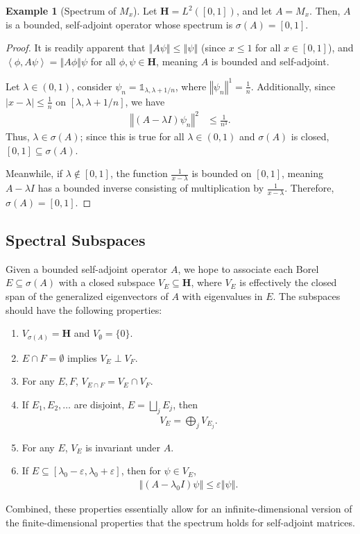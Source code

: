 \documentclass[12pt]{extarticle}
\newcommand{\iprod}[2]{\left\langle #1,#2\right\rangle}
\newcommand{\norm}[1]{\left\Vert #1\right\Vert}
\theoremstyle{plain}
\theoremstyle{definition}
\newtheorem*{example}{Example}
\theoremstyle{remark}
\renewcommand{\newline}{\hfill\break}
\begin{document}
  \begin{example}[Spectrum of $M_x$]
    Let $\mathbf{H} = L^{2}\left([0,1]\right)$, and let $A = M_x$. Then, $A$ is a bounded, self-adjoint operator whose spectrum is $\sigma(A) = [0,1]$.
  \end{example}
  \begin{proof}
    It is readily apparent that $\norm{A\psi} \leq \norm{\psi}$ (since $x\leq 1$ for all $x\in [0,1]$), and $\iprod{\phi}{A\psi} = \norm{A\phi}{\psi}$ for all $\phi,\psi \in \mathbf{H}$, meaning $A$ is bounded and self-adjoint.\newline

    Let $\lambda \in (0,1)$, consider $\psi_n = \mathbb{1}_{\lambda,\lambda + 1/n}$, where $\norm{\psi_n}^1 = \frac{1}{n}$. Additionally, since $|x - \lambda| \leq \frac{1}{n}$ on $[\lambda,\lambda + 1/n]$, we have
    \begin{align*}
      \norm{(A - \lambda I)\psi_n}^2 &\leq \frac{1}{n^3}.
    \end{align*}
    Thus, $\lambda \in \sigma(A)$; since this is true for all $\lambda \in (0,1)$ and $\sigma(A)$ is closed, $[0,1]\subseteq \sigma(A)$.\newline

    Meanwhile, if $\lambda \notin [0,1]$, the function $\frac{1}{x - \lambda}$ is bounded on $[0,1]$, meaning $A - \lambda I$ has a bounded inverse consisting of multiplication by $\frac{1}{x - \lambda}$. Therefore,$\sigma(A) = [0,1]$.
  \end{proof}
  \subsection{Spectral Subspaces}%
  Given a bounded self-adjoint operator $A$, we hope to associate each Borel $E\subseteq \sigma(A)$ with a closed subspace $V_E\subseteq \mathbf{H}$, where $V_E$  is effectively the closed span of the generalized eigenvectors of $A$ with eigenvalues in $E$. The subspaces should have the following properties:
  \begin{enumerate}[(1)]
    \item $V_{\sigma(A)} = \mathbf{H}$ and $V_{\emptyset} = \{0\}$.
    \item $E\cap F = \emptyset$ implies $V_E \perp V_F$.
    \item For any $E,F$, $V_{E\cap F} = V_E \cap V_F$.
    \item If $E_1,E_2,\dots$ are disjoint, $E = \bigsqcup_{j}E_j$, then
      \begin{align*}
        V_E = \bigoplus_{j} V_{E_j}.
      \end{align*}
    \item For any $E$, $V_E$ is invariant under $A$.
    \item If $E\subseteq [\lambda_0 - \varepsilon, \lambda_0 + \varepsilon]$, then for $\psi \in V_E$,
      \begin{align*}
        \norm{\left(A - \lambda_0 I\right)\psi} \leq \varepsilon \norm{\psi}.
      \end{align*}
  \end{enumerate}
  Combined, these properties essentially allow for an infinite-dimensional version of the finite-dimensional properties that the spectrum holds for self-adjoint matrices.
\end{document}
